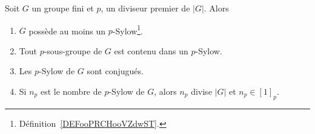 \begin{theorem}  \label{ThoUkPDXf}
    Soit \( G\) un groupe fini et \( p\), un diviseur premier de \( | G |\). Alors
    \begin{enumerate}
        \item       \label{ITEMooETYHooXlUMQZ}
            \( G\) possède au moins un \( p\)-Sylow\footnote{Définition~\ref{DEFooPRCHooVZdwST}.}.
        \item
            Tout \( p\)-sous-groupe de \( G\) est contenu dans un \( p\)-Sylow.
        \item   \label{ItemMzNRVf}
            Les \( p\)-Sylow de \( G\) sont conjugués.
        \item   \label{ItemkYbdzZ}
            Si \( n_p\) est le nombre de $p$-Sylow de \( G\), alors \( n_p\) divise \( | G |\) et \( n_p\in[1]_p\).
    \end{enumerate}
\end{theorem}

